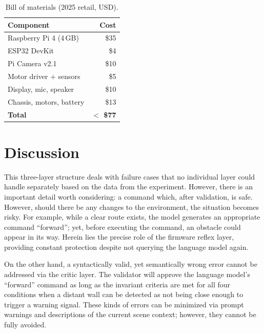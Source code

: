 \documentclass[conference]{IEEEtran}
\begin{document}
\begin{table}[t]
\caption{Bill of materials (2025 retail, USD).}
\label{tab:bom}
\centering
\renewcommand{\arraystretch}{1.05}
\begin{tabularx}{\columnwidth}{@{}YR@{}}
\toprule
\textbf{Component} & \textbf{Cost} \\
\midrule
Raspberry Pi 4 (4\,GB) & \$35 \\
ESP32 DevKit             & \$4 \\
Pi Camera v2.1           & \$10 \\
Motor driver + sensors   & \$5 \\
Display, mic, speaker    & \$10 \\
Chassis, motors, battery & \$13 \\
\midrule
\textbf{Total}           & \textbf{$<$ \$77} \\
\bottomrule
\end{tabularx}
\end{table}

\section{Discussion}
\label{sec:discussion}

This three-layer structure deals with failure cases that no individual layer could handle separately based on the data from the experiment. However, there is an important detail worth considering: a command which, after validation, is safe. However, should there be any changes to the environment, the situation becomes risky. For example, while a clear route exists, the model generates an appropriate command ``forward''; yet, before executing the command, an obstacle could appear in its way. Herein lies the precise role of the firmware reflex layer, providing constant protection despite not querying the language model again.

On the other hand, a syntactically valid, yet semantically wrong error cannot be addressed via the critic layer. The validator will approve the language model's ``forward'' command as long as the invariant criteria are met for all four conditions when a distant wall can be detected as not being close enough to trigger a warning signal. These kinds of errors can be minimized via prompt warnings and descriptions of the current scene context; however, they cannot be fully avoided.
\end{document}
